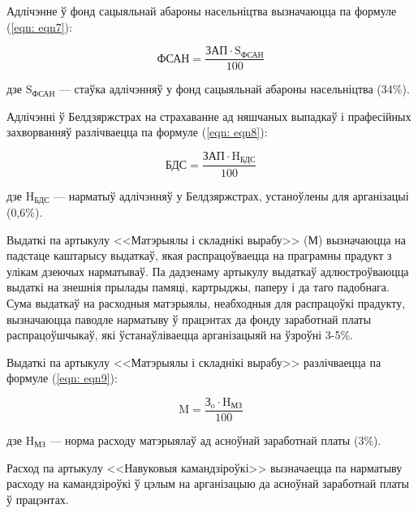 Адлічэнне ў фонд сацыяльнай абароны насельніцтва вызначаюцца па формуле (\ref{eqn: eqn7}):

\begin{equation}
    \label{eqn: eqn7}
    \text{ФСАН} = \frac{\text{ЗАП} \cdot \text{S}_\text{ФСАН}}{100}
\end{equation}
\begin{Explanation}
    \item[дзе] $\text{S}_\text{ФСАН}$ --- стаўка адлічэнняў у фонд сацыяльнай абароны насельніцтва (34\%).
\end{Explanation}

Адлічэнні ў Белдзяржстрах на страхаванне ад няшчаных выпадкаў і прафесійных захворванняў разлічваецца па формуле (\ref{eqn: eqn8}):

\begin{equation}
    \label{eqn: eqn8}
    \text{БДС} = \frac{\text{ЗАП} \cdot \text{H}_\text{БДС}}{100}
\end{equation}
\begin{Explanation}
    \item[дзе] $\text{H}_\text{БДС}$ --- нарматыў адлічэнняў у Белдзяржстрах, устаноўлены для арганізацыі (0,6\%).
\end{Explanation}

Выдаткі па артыкулу <<Матэрыялы і складнікі вырабу>> (М) вызначаюцца
на падстаце каштарысу выдаткаў, якая распрацоўваецца на праграмны
прадукт з улікам дзеючых нарматываў. Па дадзенаму артыкулу выдаткаў
адлюстроўваюцца выдаткі на знешнія прылады памяці, картрыджы, паперу і да таго падобнага. Сума выдаткаў на расходныя матэрыялы,
неабходныя для распрацоўкі прадукту, вызначаюцца паводле нарматыву
ў працэнтах да фонду заработнай платы распрацоўшчыкаў, які ўстанаўліваецца арганізацыяй на ўзроўні 3-5\%.

Выдаткі па артыкулу <<Матэрыялы і складнікі вырабу>> разлічваецца
па формуле (\ref{eqn: eqn9}):

\begin{equation}
    \label{eqn: eqn9}
    \text{M} = \frac{\text{З}_\text{o} \cdot \text{H}_\text{МЗ}}{100}
\end{equation}
\begin{Explanation}
    \item[дзе] $\text{H}_\text{МЗ}$ --- норма расходу матэрыялаў ад асноўнай заработнай платы (3\%).
\end{Explanation}

Расход па артыкулу <<Навуковыя камандзіроўкі>> вызначаецца па нарматыву расходу на камандзіроўкі ў цэлым на арганізацыю да асноўнай заработнай платы ў працэнтах.

